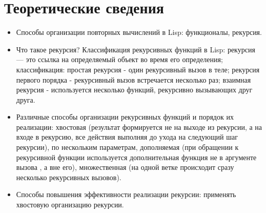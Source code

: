 \chapter{Теоретические сведения}

\begin{itemize}
    \item Способы организации повторных вычислений в Lisp: функционалы, рекурсия.
    \item Что такое рекурсия? Классификация рекурсивных функций в Lisp: рекурсия — это ссылка на определяемый объект во время его определения; классификация: простая рекурсия - один рекурсивный вызов в теле; рекурсия первого порядка - рекурсивный вызов встречается несколько раз; взаимная рекурсия - используется несколько функций, рекурсивно вызывающих друг друга.
    \item Различные способы организации рекурсивных функций и порядок их реализации: хвостовая (результат формируется не на выходе из рекурсии, а на входе в рекурсию, все действия выполняя до ухода на следующий шаг рекурсии), по нескольким параметрам, дополняемая (при обращении к рекурсивной функции используется дополнительная функция не в аргументе вызова , а вне его), множественная (на одной ветке происходит сразу несколько рекурсивных вызовов).
    \item Способы повышения эффективности реализации рекурсии: применять хвостовую организацию рекурсии.
\end{itemize}

